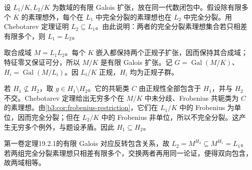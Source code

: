 \begin{optionalexercise}\label{b3:ex:A-splitting-determines-galois-field}
	设 \(L_1/K,L_2/K\) 为数域的有限 Galois 扩张，放在同一代数闭包中。假设除有限多个 \(K\) 的素理想外，每个在 \(L_1\) 中完全分裂的素理想也在 \(L_2\) 中完全分裂。用 Chebotarev 定理证明 \(L_2\subseteq L_1\)。由此说明：两者的完全分裂素理想集合若只相差有限多个，则 \(L_1=L_2\)。
\end{optionalexercise}
\begin{solution}
	取合成域 \(M=L_1L_2\)。每个 \(K\) 嵌入都保持两个正规子扩张，因而保持其合成域；特征零又保证可分，所以 \(M/K\) 是有限 Galois 扩张。记 \(G=\operatorname{Gal}(M/K)\)、\(H_i=\operatorname{Gal}(M/L_i)\)。因 \(L_i/K\) 正规，\(H_i\) 均为正规子群。

	若 \(H_1\not\subseteq H_2\)，取 \(g\in H_1\setminus H_2\)。它的共轭类 \(C\) 由正规性全部包含于 \(H_1\)，并与 \(H_2\) 不交。Chebotarev 定理给出无穷多个在 \(M/K\) 中未分歧、Frobenius 共轭类为 \(C\) 的素理想。由\cref{b3:cor:frobenius-restriction}，它们在 \(L_1/K\) 中的 Frobenius 为单位，因而完全分裂；但在 \(L_2/K\) 中的 Frobenius 非单位，所以不完全分裂。这产生无穷多个例外，与题设矛盾。因此 \(H_1\subseteq H_2\)。

	第一卷定理19.2.1的有限 Galois 对应反转包含关系，故 \(L_2=M^{H_2}\subseteq M^{H_1}=L_1\)。若两组完全分裂素理想只相差有限多个，交换两者再用同一论证，便得双向包含，故两域相等。
\end{solution}
